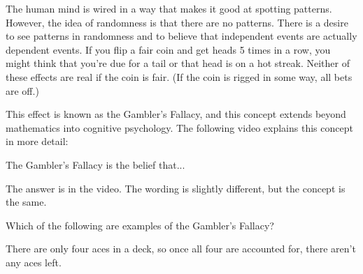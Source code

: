 \documentclass{ximera}
\begin{document}
The human mind is wired in a way that makes it good at spotting patterns. However, the idea of randomness is that there are no patterns. There is a desire to see patterns in randomness and to believe that independent events are actually dependent events. If you flip a fair coin and get heads 5 times in a row, you might think that you're due for a tail or that head is on a hot streak. Neither of these effects are real if the coin is fair. (If the coin is rigged in some way, all bets are off.)

This effect is known as the Gambler's Fallacy, and this concept extends beyond mathematics into cognitive psychology. The following video explains this concept in more detail: 



\begin{question}
The Gambler's Fallacy is the belief that...
  \begin{solution}
    \begin{multiple-choice}
      \end{multiple-choice}
    \begin{hint}
    The answer is in the video. The wording is slightly different, but the concept is the same.
    \end{hint}
  \end{solution}
\end{question}

\begin{question}
Which of the following are examples of the Gambler's Fallacy?
  \begin{solution}
    \begin{multiple-choice}
      \end{multiple-choice}
    \begin{hint}
    There are only four aces in a deck, so once all four are accounted for, there aren't any aces left.
    \end{hint}
  \end{solution}
\end{question}
\end{document}
